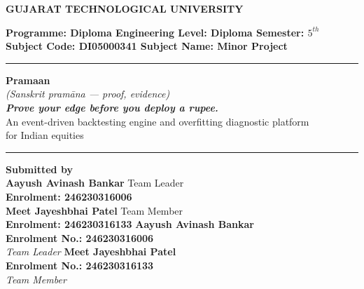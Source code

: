 \documentclass[12pt,a4paper,oneside]{report}
\newcommand{\copyMode}{0}
\begin{document}
\begin{titlepage}
    \begin{center}
        \vspace*{0.1cm}
        \LARGE
        \textbf{\textcolor{gtured}{GUJARAT TECHNOLOGICAL UNIVERSITY}}

        \vspace{0.4cm}
        \large
        \textbf{Programme: Diploma Engineering \quad Level: Diploma \quad Semester: $5^{th}$} \\
        \textbf{Subject Code: DI05000341 \quad Subject Name: Minor Project}

        \vspace{0.4cm}
        \rule{\textwidth}{1pt}
        \vspace{0.25cm}

        \Huge
        \textbf{\textcolor{gtublue}{Pramaan}} \\
        \vspace{0.1cm}
        \normalsize
        \textit{(Sanskrit pram\={a}na --- proof, evidence)} \\
        \vspace{0.15cm}
        \Large
        \textbf{\textit{Prove your edge before you deploy a rupee.}} \\
        \vspace{0.15cm}
        \large
        An event-driven backtesting engine and overfitting diagnostic platform \\
        for Indian equities

        \vspace{0.25cm}
        \rule{\textwidth}{1pt}
        \vspace{0.5cm}

        \textbf{Submitted by} \\[0.2cm]
\ifcase\copyMode
        {\Large \textbf{Aayush Avinash Bankar} \quad Team Leader} \\
        \textbf{Enrolment: 246230316006} \\[0.15cm]
        {\large \textbf{Meet Jayeshbhai Patel} \quad Team Member} \\
        \textbf{Enrolment: 246230316133}
\or
        {\LARGE \textbf{Aayush Avinash Bankar}} \\[0.15cm]
        \textbf{Enrolment No.: 246230316006} \\[0.1cm]
        \textit{Team Leader}
\or
        {\LARGE \textbf{Meet Jayeshbhai Patel}} \\[0.15cm]
        \textbf{Enrolment No.: 246230316133} \\[0.1cm]
        \textit{Team Member}
\fi


\end{center}
\end{titlepage}
\end{document}
